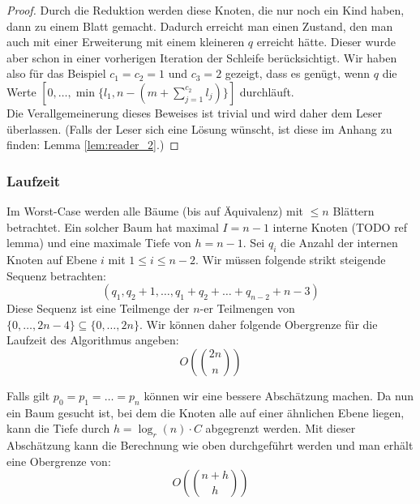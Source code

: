 \documentclass[a4paper,10pt,ngerman]{scrartcl}
\begin{document}
\begin{proof}
        Durch die Reduktion werden diese Knoten, die nur noch ein Kind haben, dann zu einem Blatt gemacht.
        Dadurch erreicht man einen Zustand, den man auch mit einer Erweiterung mit einem kleineren $q$ erreicht hätte.
        Dieser wurde aber schon in einer vorherigen Iteration der Schleife berücksichtigt.
        Wir haben also für das Beispiel $c_1 = c_2 = 1$ und $c_3 = 2$ gezeigt, dass es genügt, wenn $q$ die Werte $[0, \dots, \min\{l_1, n - (m + \sum^{c_2}_{j=1} l_j)\}]$ durchläuft.\\
        Die Verallgemeinerung dieses Beweises ist trivial und wird daher dem Leser überlassen.
        (Falls der Leser sich eine Lösung wünscht, ist diese im Anhang zu finden: Lemma \ref{lem:reader_2}.)
    \end{proof}

    \subsubsection{Laufzeit}
    Im Worst-Case werden alle Bäume (bis auf Äquivalenz) mit $\le n$ Blättern betrachtet.
    Ein solcher Baum hat maximal $I = n - 1$ interne Knoten (TODO ref lemma) und eine maximale Tiefe von $h = n - 1$.
    Sei $q_i$ die Anzahl der internen Knoten auf Ebene $i$ mit $1 \le i \le n - 2$.
    Wir müssen folgende strikt steigende Sequenz betrachten:
    \[(q_1, q_2 + 1, \dots, q_1 + q_2 + \dots + q_{n - 2} + n - 3)\]
    Diese Sequenz ist eine Teilmenge der $n$-er Teilmengen von $\{0, \dots, 2n - 4\} \subseteq \{0, \dots, 2n\}$.
    Wir können daher folgende Obergrenze für die Laufzeit des Algorithmus angeben:
    \[O\left({{2n} \choose n}  \right)\]

    Falls gilt $p_0 = p_1 = \dots = p_n$ können wir eine bessere Abschätzung machen.
    Da nun ein Baum gesucht ist, bei dem die Knoten alle auf einer ähnlichen Ebene liegen, kann die Tiefe durch $h = \log_r(n) \cdot C$
    abgegrenzt werden.
    Mit dieser Abschätzung kann die Berechnung wie oben durchgeführt werden und man erhält eine Obergrenze von:
    \[O\left({n + h} \choose h \right)\]
\end{document}
